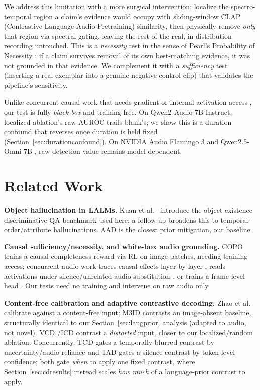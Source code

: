 \documentclass{article}
\begin{document}
We address this limitation with a more surgical intervention: localize
the spectro-temporal region a claim's evidence would occupy with
sliding-window CLAP (Contrastive Language-Audio Pretraining) similarity,
then physically remove \emph{only} that
region via spectral gating, leaving the rest of the real, in-distribution
recording untouched. This is a \emph{necessity} test in the sense of
Pearl's Probability of Necessity \cite{pearl2000causality,tian2000probabilities}:
if a claim survives removal of its own best-matching evidence, it was not
grounded in that evidence. We complement it with a \emph{sufficiency}
test (inserting a real exemplar into a genuine negative-control clip)
that validates the pipeline's sensitivity.

Unlike concurrent causal work that needs gradient or
internal-activation access
\cite{guo2026copo,causaltracing2026,tracinggrounding2026,frameleveltool2026},
our test is fully \emph{black-box} and training-free. On
Qwen2-Audio-7B-Instruct, localized ablation's raw AUROC trails blank's;
we show this is a duration confound that reverses once duration is
held fixed (Section~\ref{sec:durationconfound}). On NVIDIA Audio
Flamingo 3 \cite{goel2025audioflamingo3} and Qwen2.5-Omni-7B
\cite{qwen25omni2025}, raw detection value remains model-dependent.

\section{Related Work}

\textbf{Object hallucination in LALMs.} Kuan et al.\
\cite{kuan2024understanding} introduce the object-existence
discriminative-QA benchmark used here; a follow-up \cite{kuan2025can}
broadens this to temporal-order/attribute hallucinations. AAD
\cite{hsu2025aad} is the closest prior mitigation, our baseline.

\textbf{Causal sufficiency/necessity, and white-box audio grounding.}
COPO \cite{guo2026copo} trains a causal-completeness reward via RL on
image patches, needing training access; concurrent audio work traces
causal effects layer-by-layer \cite{causaltracing2026}, reads
activations under silence/unrelated-audio substitution
\cite{tracinggrounding2026}, or trains a frame-level head
\cite{frameleveltool2026}. Our tests need no training and intervene on
raw audio only.

\textbf{Content-free calibration and adaptive contrastive decoding.}
Zhao et al.\ \cite{zhao2021calibrate} calibrate against a content-free
input; M3ID \cite{favero2024m3id} contrasts an image-absent baseline,
structurally identical to our Section~\ref{sec:langprior} analysis
(adapted to audio, not novel). VCD
\cite{leng2024vcd}/ICD \cite{icd2024} contrast a \emph{distorted}
input, closer to our localized/random ablation. Concurrently, TCD
\cite{li2026tcd} gates a temporally-blurred contrast by
uncertainty/audio-reliance and TAD \cite{chang2026tad} gates a silence
contrast by token-level confidence; both gate \emph{when} to apply one
fixed contrast, where Section~\ref{sec:cdresults} instead scales
\emph{how much} of a language-prior contrast to apply.
\end{document}
